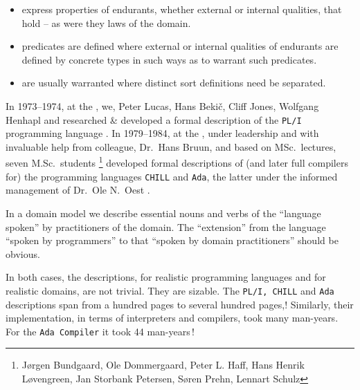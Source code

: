 \mnewfoil
   
\begin{itemize}
\item {} express properties of endurants, whether
      external or internal qualities, that hold\ysfchg{ } -- as were they laws of
      the domain.
\item {} predicates are defined where  external
      or internal qualities of endurants are defined by concrete types
      in such ways as to warrant such predicates.  
\item {} are usually warranted where distinct
      sort definitions need be separated.
\end{itemize}
  
\label{primer:From Programming Language Semantics to Domain Models}

\begynd
\pind In 1973--1974, at the , we,
\begynd
\pind Peter Lucas, Hans Beki{\v{c}}, Cliff Jones, Wolfgang Henhapl and
\pind researched \& developed a formal description of the
      \texttt{PL/I} programming language \cite{db74:r:Bek74}.
\afslut
\pind In 1979--1984, at the , \nyl under 
      leadership and with invaluable help from  colleague, Dr.\ Hans
      Bruun, \nyl and based on   MSc.\ lectures,
\begynd
\pind seven M.Sc.\ students%
\footnote{%
          J{\o}rgen Bundgaard,
          Ole Dommergaard,
          Peter L. Haff,
          Hans Henrik L{\o}vengreen,
          Jan Storbank Petersen,
          S{\o}ren Prehn,
          Lennart Schulz}
developed formal descriptions of (and later full compilers for) the
     programming languages \texttt{CHILL} \cite{vdm:Haff} and \texttt{Ada}, the latter
          under the informed management of Dr.\ Ole N.\ Oest \cite{e:db:Bj80f}.
\afslut
\afslut

\mnewfoil\LLLL

\begynd
\pind In a domain model we describe essential nouns and verbs of the
      ``language spoken'' by practitioners of the domain.
\begynd
\pind The ``extension'' from the language ``spoken by programmers'' to
      that ``spoken by domain practitioners'' should be obvious.
\afslut
\afslut

\begynd
\pind In both cases, the descriptions, for realistic programming
      languages and for realistic domains, are not trivial.
\begynd
\pind They are sizable.
\pind The \texttt{PL/I, CHILL} and \texttt{Ada} descriptions
      span from a hundred pages to several hundred pages,!
\afslut
\pind Similarly, their implementation, in terms of interpreters and
      compilers, took many man-years.
\begynd
\pind For the  \texttt{Ada Compiler} \cite{Haff87,Clem84} it took 44 man-years\,!
\afslut
\afslut

